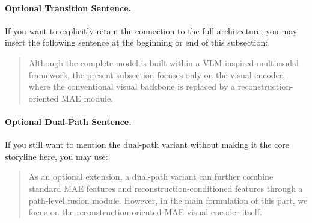 \paragraph{Optional Transition Sentence.}
If you want to explicitly retain the connection to the full architecture, you may insert the following sentence at the beginning or end of this subsection:
\begin{quote}
Although the complete model is built within a VLM-inspired multimodal framework, the present subsection focuses only on the visual encoder, where the conventional visual backbone is replaced by a reconstruction-oriented MAE module.
\end{quote}

\paragraph{Optional Dual-Path Sentence.}
If you still want to mention the dual-path variant without making it the core storyline here, you may use:
\begin{quote}
As an optional extension, a dual-path variant can further combine standard MAE features and reconstruction-conditioned features through a path-level fusion module. However, in the main formulation of this part, we focus on the reconstruction-oriented MAE visual encoder itself.
\end{quote}
